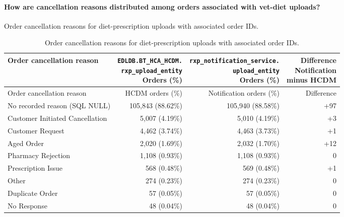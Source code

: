 \paragraph{How are cancellation reasons distributed among orders associated with vet-diet uploads?}
Order cancellation reasons for diet-prescription uploads with associated order IDs.

\begin{longtable}{@{}lrrr@{}}
\caption{Order cancellation reasons for diet-prescription uploads with associated order IDs.}
\label{tab:diet-upload-source-cancel-reasons}\\
\toprule
Order cancellation reason & \shortstack{\texttt{EDLDB.BT\_HCA\_HCDM.}\\\texttt{rxp\_upload\_entity}\\Orders (\%)} & \shortstack{\texttt{rxp\_notification\_service.}\\\texttt{upload\_entity}\\Orders (\%)} & \shortstack{Difference\\Notification\\minus HCDM} \\
\midrule
\endfirsthead
\toprule Order cancellation reason & HCDM orders (\%) & Notification orders (\%) & Difference \\
\midrule
\endhead

{No recorded reason (SQL NULL)} & 105,843 (88.62\%) & 105,940 (88.58\%) & +97 \\

{Customer Initiated Cancellation} & 5,007 (4.19\%) & 5,010 (4.19\%) & +3 \\

{Customer Request} & 4,462 (3.74\%) & 4,463 (3.73\%) & +1 \\

{Aged Order} & 2,020 (1.69\%) & 2,032 (1.70\%) & +12 \\

{Pharmacy Rejection} & 1,108 (0.93\%) & 1,108 (0.93\%) & 0 \\

{Prescription Issue} & 568 (0.48\%) & 569 (0.48\%) & +1 \\

{Other} & 274 (0.23\%) & 274 (0.23\%) & 0 \\

{Duplicate Order} & 57 (0.05\%) & 57 (0.05\%) & 0 \\

{No Response} & 48 (0.04\%) & 48 (0.04\%) & 0 \\


\end{longtable}
